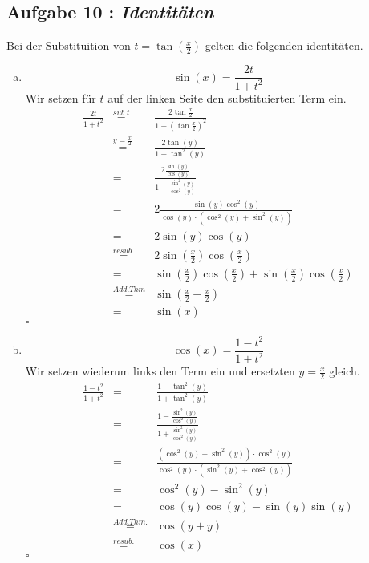 \documentclass[11pt,a4paper,ngerman]{article}
\begin{document}
\subsection*{Aufgabe 10 : \mdseries\itshape Identitäten}

Bei der Substituition von $t = \tan \left(\frac{x}{2} \right)$ gelten die folgenden
identitäten.

\begin{enumerate}[a.]
    \addtocounter{enumi}{4}
    \item
        $$
            \sin (x) = \frac{2t}{1+t^2}
        $$
        Wir setzen für $t$ auf der linken Seite den substituierten Term ein.
        $$\begin{array}{rcl}
            \frac{2t}{1+t^2} &\stackrel{sub. t}{=}& \frac{2\tan\frac{x}{2}}{1+(\tan \frac{x}{2})^2}\\
                &\stackrel{y=\frac{x}{2}}{=}&
                    \frac{2\tan (y)}{1+\tan^2 (y)}\\
                &=& \frac{2 \frac{\sin(y)}{\cos(y)}}{1+ \frac{\sin^2(y)}{\cos^2 (y)}}\\
                &=& 2\frac{\sin (y) \cos^2 (y)}{\cos(y) \cdot (\cos^2(y) + \sin^2(y))}\\
                &=& 2 \sin(y)\cos(y)\\
                &\stackrel{resub.}{=}& 2 \sin(\frac{x}{2})\cos(\frac{x}{2})\\
                &=& \sin(\frac{x}{2})\cos(\frac{x}{2}) + \sin(\frac{x}{2})\cos(\frac{x}{2})\\
                &\stackrel{Add.Thm}{=}& \sin(\frac{x}{2} + \frac{x}{2})\\
                &=& \sin(x)
        \end{array}$$
        \mbox{}\hfill $\square$
    \item
        $$
            \cos (x) = \frac{1-t^2}{1+t^2}
        $$
        Wir setzen wiederum links den Term ein und ersetzten $y=\frac{x}{2}$ gleich.\\
        $$\begin{array}{rcl}
            \frac{1-t^2}{1+t^2} &=& \frac{1- \tan^2(y)}{1+\tan^2(y)}\\
                &=& \frac{1-\frac{\sin^2(y)}{\cos^2(y)}}{1+\frac{\sin^2(y)}{\cos^2(y)}}\\
                &=& \frac{(\cos^2(y)-\sin^2(y)) \cdot \cos^2(y)}{\cos^2(y) \cdot (\sin^2(y) + \cos^2(y))}\\
                &=& \cos^2(y) - \sin^2(y)\\
                &=& \cos(y)\cos(y) - \sin(y)\sin(y)\\
                &\stackrel{Add.Thm.}{=}& \cos( y + y)\\
                &\stackrel{resub.}{=}& \cos(x)
        \end{array}$$
        \mbox{} \hfill $\square$

\end{enumerate}
        
\end{document}
